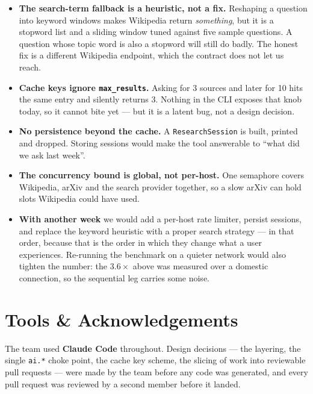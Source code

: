 \documentclass[11pt,a4paper]{article}
\begin{document}
\begin{itemize}[leftmargin=1.2em, itemsep=3pt]
  \item \textbf{The search-term fallback is a heuristic, not a fix.} Reshaping a question into
  keyword windows makes Wikipedia return \emph{something}, but it is a stopword list and a sliding
  window tuned against five sample questions. A question whose topic word is also a stopword will
  still do badly. The honest fix is a different Wikipedia endpoint, which the contract does not let
  us reach.
  \item \textbf{Cache keys ignore \texttt{max\_results}.} Asking for 3 sources and later for 10 hits
  the same entry and silently returns 3. Nothing in the CLI exposes that knob today, so it cannot
  bite yet --- but it is a latent bug, not a design decision.
  \item \textbf{No persistence beyond the cache.} A \texttt{ResearchSession} is built, printed and
  dropped. Storing sessions would make the tool answerable to ``what did we ask last week''.
  \item \textbf{The concurrency bound is global, not per-host.} One semaphore covers Wikipedia,
  arXiv and the search provider together, so a slow arXiv can hold slots Wikipedia could have used.
  \item \textbf{With another week} we would add a per-host rate limiter, persist sessions, and
  replace the keyword heuristic with a proper search strategy --- in that order, because that is the
  order in which they change what a user experiences. Re-running the benchmark on a quieter network
  would also tighten the number: the $3.6\times$ above was measured over a domestic connection, so
  the sequential leg carries some noise.
\end{itemize}

\section{Tools \& Acknowledgements}\label{sec:tools}

The team used \textbf{Claude Code} throughout. Design decisions --- the layering, the single
\texttt{ai.*} choke point, the cache key scheme, the slicing of work into reviewable pull requests
--- were made by the team before any code was generated, and every pull request was reviewed by a
second member before it landed.
\end{document}
